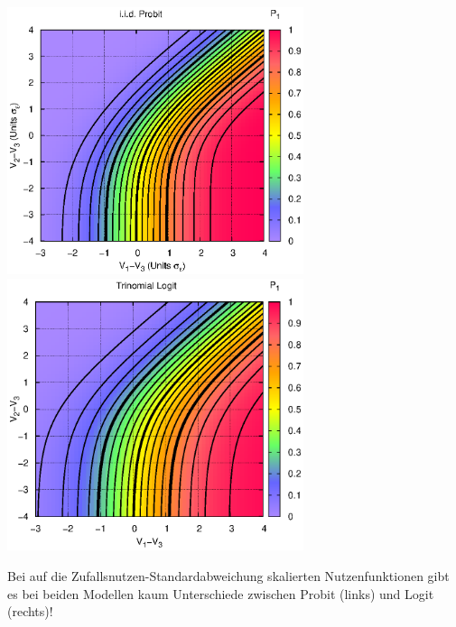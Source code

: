 \documentclass[a4paper]{foils}
\begin{document}
\begin{landscape}
\begin{center}
 \includegraphics[width=0.65\textwidth]{./figsDiscr/pProbitTrinom_V1V2.eps}   
 \includegraphics[width=0.65\textwidth]{./figsDiscr/pLogitTrinom_V1V2.eps}   
\vspace{1em}

\parbox{1.1\textwidth}{Bei auf die Zufallsnutzen-Standardabweichung skalierten
  Nutzenfunktionen gibt 
es bei beiden Modellen kaum Unterschiede zwischen Probit (links) und Logit (rechts)!}


\newpage

\vspace{1em}


\end{center}
\end{landscape}
\end{document}

